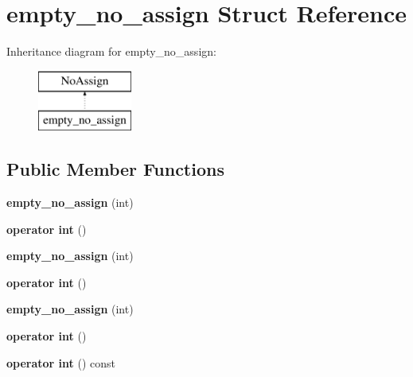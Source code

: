 \hypertarget{structempty__no__assign}{}\section{empty\+\_\+no\+\_\+assign Struct Reference}
\label{structempty__no__assign}
Inheritance diagram for empty\+\_\+no\+\_\+assign\+:\begin{figure}[H]
\begin{center}
\leavevmode
\includegraphics[height=2.000000cm]{structempty__no__assign}
\end{center}
\end{figure}
\subsection*{Public Member Functions}
\begin{DoxyCompactItemize}
\item 
\hypertarget{structempty__no__assign_ae315b779d9872be1022e90b51383b0ef}{}{\bfseries empty\+\_\+no\+\_\+assign} (int)\label{structempty__no__assign_ae315b779d9872be1022e90b51383b0ef}

\item 
\hypertarget{structempty__no__assign_aa28b114ff8ee76a80d47e10987c4bd80}{}{\bfseries operator int} ()\label{structempty__no__assign_aa28b114ff8ee76a80d47e10987c4bd80}

\item 
\hypertarget{structempty__no__assign_ae315b779d9872be1022e90b51383b0ef}{}{\bfseries empty\+\_\+no\+\_\+assign} (int)\label{structempty__no__assign_ae315b779d9872be1022e90b51383b0ef}

\item 
\hypertarget{structempty__no__assign_aa28b114ff8ee76a80d47e10987c4bd80}{}{\bfseries operator int} ()\label{structempty__no__assign_aa28b114ff8ee76a80d47e10987c4bd80}

\item 
\hypertarget{structempty__no__assign_ae315b779d9872be1022e90b51383b0ef}{}{\bfseries empty\+\_\+no\+\_\+assign} (int)\label{structempty__no__assign_ae315b779d9872be1022e90b51383b0ef}

\item 
\hypertarget{structempty__no__assign_aa28b114ff8ee76a80d47e10987c4bd80}{}{\bfseries operator int} ()\label{structempty__no__assign_aa28b114ff8ee76a80d47e10987c4bd80}

\item 
\hypertarget{structempty__no__assign_a0921bdfd110b2635b7c140a8a94ec87d}{}{\bfseries operator int} () const \label{structempty__no__assign_a0921bdfd110b2635b7c140a8a94ec87d}

\end{DoxyCompactItemize}


